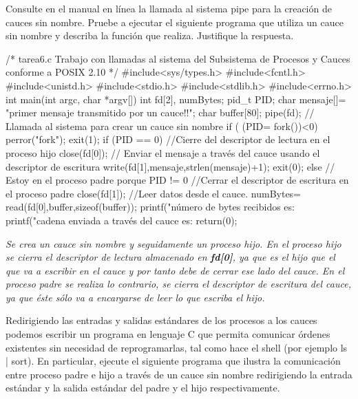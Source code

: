 \begin{exercise}
Consulte en el manual en línea la llamada al sistema pipe para la creación de
cauces sin nombre. Pruebe a ejecutar el siguiente programa que utiliza un cauce sin nombre y
describa la función que realiza. Justifique la respuesta.
\begin{cppcode}
/*
tarea6.c
Trabajo con llamadas al sistema del Subsistema de Procesos y Cauces conforme a
POSIX 2.10
*/
#include<sys/types.h>
#include<fcntl.h>
#include<unistd.h>
#include<stdio.h>
#include<stdlib.h>
#include<errno.h>
int main(int argc, char *argv[])
{
int fd[2], numBytes;
pid_t PID;
char mensaje[]= "\nEl primer mensaje transmitido por un cauce!!\n";
char buffer[80];
pipe(fd); // Llamada al sistema para crear un cauce sin nombre
if ( (PID= fork())<0) {
perror("fork");
exit(1);
}
if (PID == 0) {
//Cierre del descriptor de lectura en el proceso hijo
close(fd[0]);
// Enviar el mensaje a través del cauce usando el descriptor de escritura
write(fd[1],mensaje,strlen(mensaje)+1);
exit(0);
}
else { // Estoy en el proceso padre porque PID != 0
//Cerrar el descriptor de escritura en el proceso padre
close(fd[1]);
//Leer datos desde el cauce.
numBytes= read(fd[0],buffer,sizeof(buffer));
printf("\nEl número de bytes recibidos es: %
printf("\nLa cadena enviada a través del cauce es: %
}
return(0);
}
\end{cppcode}
\emph{Se crea un cauce sin nombre y seguidamente un proceso hijo. En el proceso hijo se cierra el descriptor de lectura almacenado en \textbf{fd[0]}, ya que 
es el hijo que el que va a escribir en el cauce y por tanto debe de cerrar ese lado del cauce. En el proceso padre se realiza lo contrario, se cierra el descriptor de escritura del cauce, ya que éste sólo va a encargarse de leer lo que escriba el hijo.}
\end{exercise}

\begin{exercise}
Redirigiendo las entradas y salidas estándares de los procesos a los cauces
podemos escribir un programa en lenguaje C que permita comunicar órdenes existentes sin
necesidad de reprogramarlas, tal como hace el shell (por ejemplo ls | sort). En particular,
ejecute el siguiente programa que ilustra la comunicación entre proceso padre e hijo a través
de un cauce sin nombre redirigiendo la entrada estándar y la salida estándar del padre y el
hijo respectivamente.
\end{exercise}


